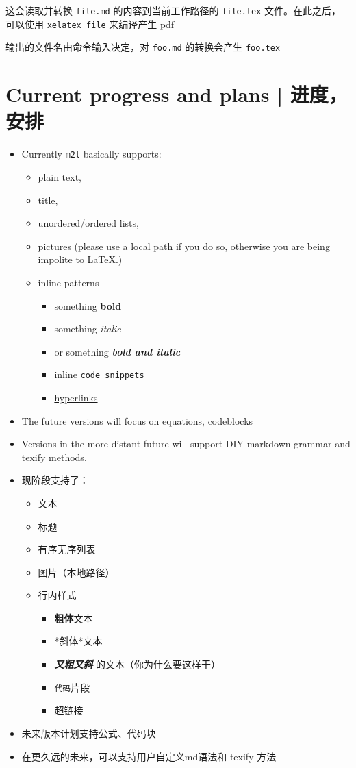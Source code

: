\documentclass{ctexart}
\begin{document}
	这会读取并转换 \texttt{file.md} 的内容到当前工作路径的 \texttt{file.tex} 文件。在此之后，可以使用 \texttt{xelatex file} 来编译产生 pdf

	输出的文件名由命令输入决定，对 \texttt{foo.md} 的转换会产生 \texttt{foo.tex}

	\section{Current progress and plans | 进度，安排}

	\begin{itemize}
		\item Currently \texttt{m2l} basically supports:
		\begin{itemize}
			\item plain text,
			\item title,
			\item unordered/ordered lists,
			\item pictures (please use a local path if you do so, otherwise you are being impolite to LaTeX.)
			\item inline patterns
			\begin{itemize}
				\item something \textbf{bold}
				\item something \textit{italic}
				\item or something \textbf{\textit{bold and italic}}
				\item inline \texttt{code snippets}
				\item \href{https://http.cat/404}{hyperlinks}
			\end{itemize}
		\end{itemize}
		\item The future versions will focus on equations, codeblocks
		\item Versions in the more distant future will support DIY markdown grammar and texify methods.
	\end{itemize}

	\begin{itemize}
		\item 现阶段支持了：
		\begin{itemize}
			\item 文本
			\item 标题
			\item 有序无序列表
			\item 图片（本地路径）
			\item 行内样式
			\begin{itemize}
				\item \textbf{粗体}文本
				\item *斜体*文本
				\item \textbf{\textit{又粗又斜}} 的文本（你为什么要这样干）
				\item \texttt{代码}片段
				\item \href{https://http.cat/404}{超链接}
			\end{itemize}
		\end{itemize}
		\item 未来版本计划支持公式、代码块
		\item 在更久远的未来，可以支持用户自定义md语法和 texify 方法
	\end{itemize}
\end{document}
